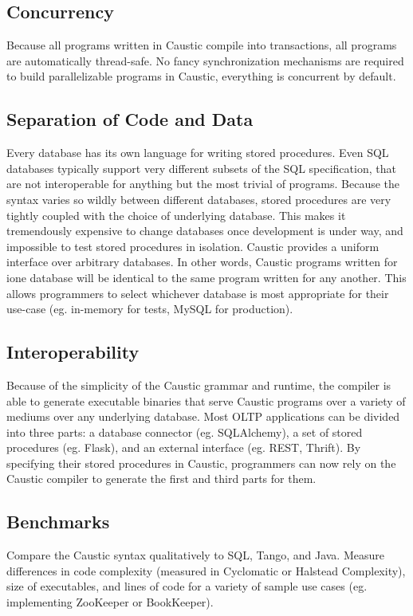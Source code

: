 \documentclass[journal]{../styles/IEEEtran}
\begin{document}
\subsection{Concurrency}
Because all programs written in Caustic compile into transactions, all programs are automatically thread-safe. No fancy synchronization mechanisms are required to build parallelizable programs in Caustic, everything is concurrent by default.

\subsection{Separation of Code and Data}
Every database has its own language for writing stored procedures. Even SQL databases typically support very different subsets of the SQL specification, that are not interoperable for anything but the most trivial of programs.  Because the syntax varies so wildly between different databases, stored procedures are very tightly coupled with the choice of underlying database. This makes it tremendously expensive to change databases once development is under way, and impossible to test stored procedures in isolation. Caustic provides a uniform interface over arbitrary databases. In other words, Caustic programs written for ione database will be identical to the same program written for any another. This allows programmers to select whichever database is most appropriate for their use-case (eg. in-memory for tests, MySQL for production). 

\subsection{Interoperability}
Because of the simplicity of the Caustic grammar and runtime, the compiler is able to generate executable binaries that serve Caustic programs over a variety of mediums over any underlying database. Most OLTP applications can be divided into three parts: a database connector (eg. SQLAlchemy), a set of stored procedures (eg. Flask), and an external interface (eg. REST, Thrift). By specifying their stored procedures in Caustic, programmers can now rely on the Caustic compiler to generate the first and third parts for them. 

\subsection{Benchmarks}
Compare the Caustic syntax qualitatively to SQL, Tango, and Java. Measure differences in code complexity (measured in Cyclomatic or Halstead Complexity), size of executables, and lines of code for a variety of sample use cases (eg. implementing ZooKeeper or BookKeeper). 
\end{document}
